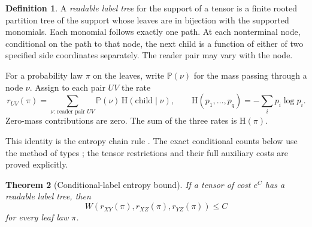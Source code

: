 \documentclass[11pt]{article}
\numberwithin{equation}{section}
\newtheorem{theorem}{Theorem}[section]
\theoremstyle{definition}
\newtheorem{definition}[theorem]{Definition}
\theoremstyle{remark}
\begin{document}
\begin{definition}\label{def:label-tree}
A \emph{readable label tree} for the support of a tensor is a finite
rooted partition tree of the support whose leaves are in bijection
with the supported monomials.  Each monomial follows exactly one path.
At each nonterminal node, conditional on the path to that node, the
next child is a function of either of two specified side coordinates
separately.
The reader pair may vary with the node.
\end{definition}

For a probability law \(\pi\) on the leaves, write \(\mathbb P(\nu)\) for
the mass passing through a node \(\nu\).
Assign to each pair \(UV\) the rate
\[
 r_{UV}(\pi)=
 \sum_{\nu:\,\text{reader pair }UV}
 \mathbb P(\nu)\,\mathrm H(\text{child}\mid\nu),
 \qquad
 \mathrm H(p_1,\ldots,p_q)=-\sum_i p_i\log p_i.
\]
Zero-mass contributions are zero.
The sum of the three rates is \(\mathrm H(\pi)\).

This identity is the entropy chain rule \cite[Section~6]{shannon1948}.
The exact conditional counts below use the method of types
\cite[Section~II]{csiszar1998}; the tensor restrictions and their full
auxiliary costs are proved explicitly.

\begin{theorem}[Conditional-label entropy bound]\label{thm:entropy}
If a tensor of cost \(e^C\) has a readable label tree, then
\begin{equation}\label{eq:entropy-bound}
 W(r_{XY}(\pi),r_{XZ}(\pi),r_{YZ}(\pi))\le C
\end{equation}
for every leaf law \(\pi\).
\end{theorem}
\end{document}
